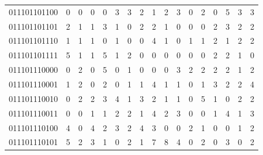 \documentclass[10pt,a4paper]{article}
\begin{document}
\begin{longtable}{ |c|c|c|c|c|c|c|c|c|c|c|c|c|c|c|c|c| }
    011101101100              & 0                            & 0                                & 0                            & 0                              & 3   & 3   & 2   & 1   & 2   & 3   & 0   & 2   & 0   & 5   & 3   & 3   \\
    011101101101              & 2                            & 1                                & 1                            & 3                              & 1   & 0   & 2   & 2   & 1   & 0   & 0   & 0   & 2   & 3   & 2   & 2   \\
    011101101110              & 1                            & 1                                & 1                            & 0                              & 1   & 0   & 0   & 4   & 1   & 0   & 1   & 1   & 2   & 1   & 2   & 2   \\
    011101101111              & 5                            & 1                                & 1                            & 5                              & 1   & 2   & 0   & 0   & 0   & 0   & 0   & 0   & 2   & 2   & 1   & 0   \\
    011101110000              & 0                            & 2                                & 0                            & 5                              & 0   & 1   & 0   & 0   & 0   & 3   & 2   & 2   & 2   & 2   & 1   & 2   \\
    011101110001              & 1                            & 2                                & 0                            & 2                              & 0   & 1   & 1   & 4   & 1   & 1   & 0   & 1   & 3   & 2   & 2   & 4   \\
    011101110010              & 0                            & 2                                & 2                            & 3                              & 4   & 1   & 3   & 2   & 1   & 1   & 0   & 5   & 1   & 0   & 2   & 2   \\
    011101110011              & 0                            & 0                                & 1                            & 1                              & 2   & 2   & 1   & 4   & 2   & 3   & 0   & 0   & 1   & 4   & 1   & 3   \\
    011101110100              & 4                            & 0                                & 4                            & 2                              & 3   & 2   & 4   & 3   & 0   & 0   & 2   & 1   & 0   & 0   & 1   & 2   \\
    011101110101              & 5                            & 2                                & 3                            & 1                              & 0   & 2   & 1   & 7   & 8   & 4   & 0   & 2   & 0   & 3   & 0   & 2   \\

\end{longtable}
\end{document}
